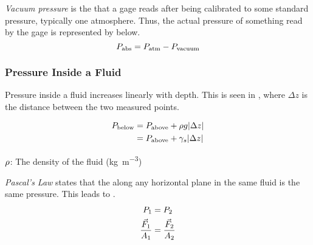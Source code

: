 \begin{definition}\label{def:Vacuum_Pressure}
  \emph{Vacuum pressure} is the  that a gage reads after being calibrated to some standard pressure, typically one atmosphere.
  Thus, the actual pressure of something read by the gage is represented by  below.
  \begin{equation}\label{eq:Vacuum_Pressure}
    P_{\mathrm{abs}} = P_{\mathrm{atm}} - P_{\mathrm{vacuum}}
  \end{equation}
\end{definition}

\subsubsection{Pressure Inside a Fluid}\label{subsubsec:Pressure_Inside_Fluid}
Pressure inside a fluid increases linearly with depth.
This is seen in , where $\Delta z$ is the distance between the two measured points.

\begin{equation}\label{eq:Pressure_in_Fluid}
  \begin{aligned}
    P_{\mathrm{below}} &= P_{\mathrm{above}} + \rho g \lvert \Delta z \rvert \\
    &= P_{\mathrm{above}} + \gamma_{s} \lvert \Delta z \rvert \\
  \end{aligned}
\end{equation}

\begin{description}[noitemsep]
\item $\rho$: The density of the fluid (\si{\kilo\gram\per\meter\cubed})
\end{description}

\begin{definition}\label{def:Pascals_Law}
  \emph{Pascal's Law} states that the  along any horizontal plane in the same fluid is the same pressure.
  This leads to .
  \begin{equation}\label{eq:Pascals_Law}
    \begin{aligned}
      P_{1} &= P_{2} \\
      \frac{\vec{F}_{1}}{A_{1}} &= \frac{\vec{F}_{2}}{A_{2}} \\
    \end{aligned}
  \end{equation}
\end{definition}

